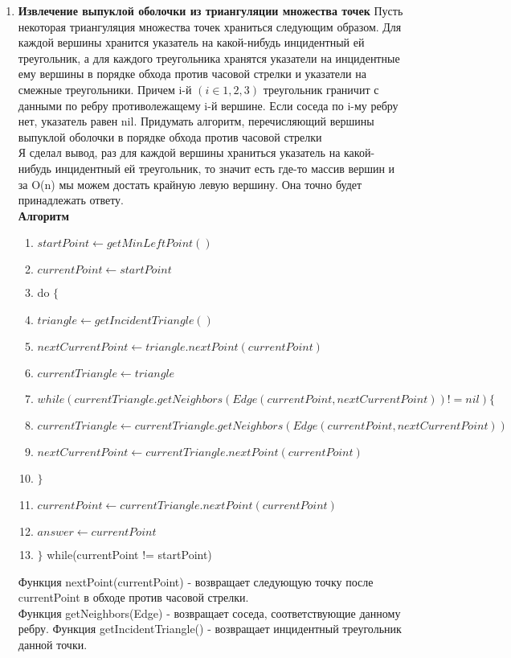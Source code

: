 \documentclass{article}
\theoremstyle{plain}
\theoremstyle{definition}
\begin{document}
\begin{enumerate}
\item \textbf{Извлечение выпуклой оболочки из триангуляции множества точек}
Пусть  некоторая триангуляция множества точек храниться следующим образом. Для каждой вершины хранится указатель на какой-нибудь инцидентный ей треугольник, а для каждого треугольника хранятся указатели на инцидентные ему вершины в порядке обхода против часовой стрелки и указатели на смежные треугольники. Причем i-й $(i \in {1, 2, 3}) $ треугольник граничит с данными по ребру противолежащему i-й вершине. Если соседа по i-му ребру нет, указатель равен nil. Придумать алгоритм, перечисляющий вершины выпуклой оболочки в порядке обхода против часовой стрелки \\
Я сделал вывод, раз для каждой вершины храниться указатель на какой-нибудь инцидентный ей треугольник, то значит есть где-то массив вершин и за O(n) мы можем достать крайную левую вершину. Она точно будет принадлежать ответу. \\   
\textbf{Алгоритм}\\
\begin{enumerate}
\item $startPoint \leftarrow getMinLeftPoint()$
\item $currentPoint \leftarrow startPoint$
\item do $\{$ 
\item    $triangle \leftarrow getIncidentTriangle()$
\item    $nextCurrentPoint \leftarrow triangle.nextPoint(currentPoint)$	
\item    $currentTriangle \leftarrow triangle$
\item    $while(currentTriangle.getNeighbors(Edge(currentPoint, nextCurrentPoint)) != nil) \{$
\item         $currentTriangle \leftarrow currentTriangle.getNeighbors(Edge(currentPoint, nextCurrentPoint))$
\item         $nextCurrentPoint \leftarrow currentTriangle.nextPoint(currentPoint)$
\item    $\}$
\item    $currentPoint \leftarrow currentTriangle.nextPoint(currentPoint)$
\item    $answer \leftarrow currentPoint$
\item $\}$ while(currentPoint != startPoint)
\end{enumerate}
Функция nextPoint(currentPoint) - возвращает следующую точку после currentPoint в обходе против часовой стрелки. \\
Функция getNeighbors(Edge) - возвращает соседа, соответствующие данному ребру.
Функция getIncidentTriangle() - возвращает инцидентный треугольник данной точки.


\end{enumerate}
\end{document}
